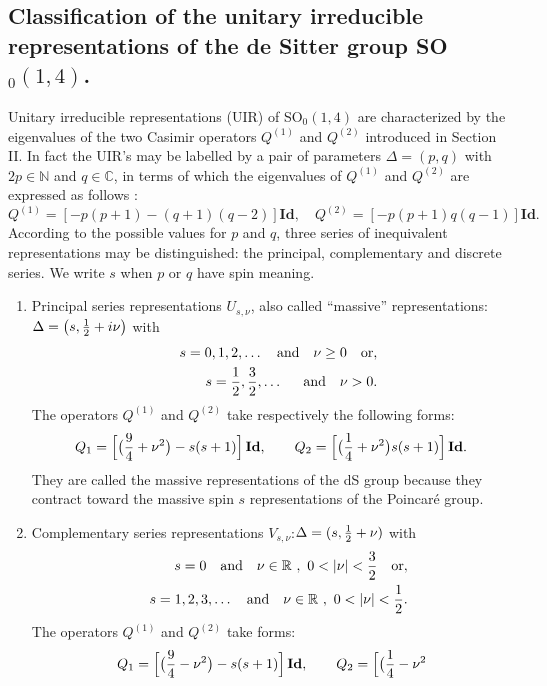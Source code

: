 \documentclass[a4paper,11pt,showpacs,preprintnumbers]{revtex4}
\def\setR{\mathbb{R}}
\def\setN{\mathbb{N}}
\def\setC{\mathbb{C}}
\def\1{\mathbf {Id} }
\begin{document}
\newpage
\setcounter{equation}{0}
\begin{appendix}
\section{Classification of the unitary irreducible representations of
the de Sitter group SO$_{0}(1,4)$.}
 Unitary irreducible representations (UIR) of
SO$_{0}(1,4)$ are characterized by the eigenvalues of the two
Casimir operators $Q^{(1)}$ and $Q^{(2)}$ introduced in Section
II. In fact the UIR's may be labelled by a pair of parameters
$\Delta =(p,q)$ with  $2p \in {\setN}$ and $q \in {\setC}$, in
terms of which the eigenvalues of $Q^{(1)}$ and $Q^{(2)}$ are
expressed as follows \cite{bagamota,dix,tak}:
$$
{Q^{(1)}}=[-p(p+1)-(q+1)(q-2)]{\1}, \quad
{Q^{(2)}}=[-p(p+1)q(q-1)]{\1}.
$$
According to the possible values for $p$ and $q$, three series of
inequivalent representations may be distinguished: the principal,
complementary and discrete series. We write $s$ when $p$ or $q$
have spin meaning.
\begin{enumerate}
\item Principal series representations $U_{s,\nu}$, also called
``massive'' representations:\quad $\Delta=\left(s,{1\over
2}+i\nu\right)$ with
\begin{eqnarray}
&&s=0,1,2,\dots \quad {\rm and} \quad  \nu\geq 0 \quad {\rm
or},\nonumber\\
&&s={1\over 2},{3\over 2},\dots \quad \ \, {\rm and} \quad  \nu
>0.\nonumber
\end{eqnarray}
The operators $Q^{(1)}$ and $Q^{(2)}$ take respectively the
following forms:
$${Q_1} =\Bigl[ \bigl( {9\over 4}+{\nu ^2} \bigr)-s(s+1) \Bigr]\,
{\1},\qquad {Q_2} =\Bigl[ \bigl( {1\over 4}+{\nu ^2} \bigl)s(s+1)
\Bigr]\, {\1}.$$
They are called the massive representations of
the dS group because they contract toward the massive spin $s$
representations of the Poincar\'e group.
\item  Complementary series representations
 $V_{s,\nu}$:\quad $\Delta=(s,{1\over 2}+\nu)$
with
\begin{eqnarray}
&&s=0 \quad {\rm and} \quad  \nu\in \setR\ ,\ 0<|\nu|<{3\over 2}
\quad {\rm
or},\nonumber\\
&&s=1,2,3,\dots \quad {\rm and} \quad \nu\in{\setR}\ ,\
0<|\nu|<{1\over 2}.\nonumber
\end{eqnarray}
The operators $Q^{(1)}$ and $Q^{(2)}$ take forms:
$$
{Q_1} =\Bigl[ \bigl( {9\over 4}-{\nu ^2} \bigr)-s(s+1)
\Bigr]\,{\1}, \qquad{Q_2} =\Bigl[ \bigl( {1\over 4}-{\nu ^2}
$$
\end{enumerate}
\end{appendix}
\end{document}
